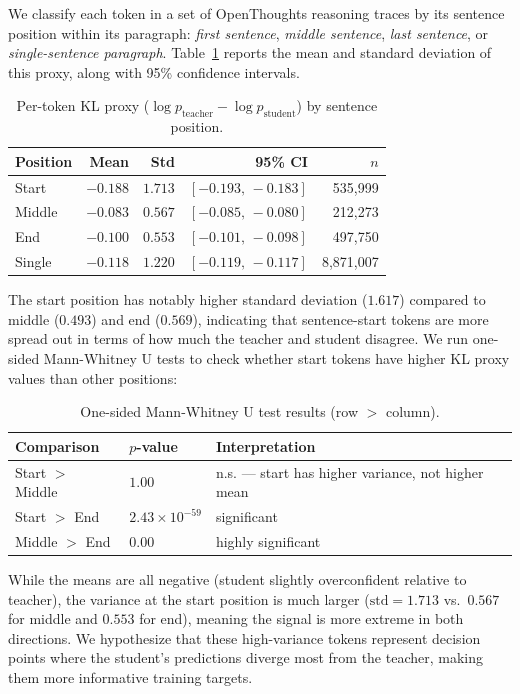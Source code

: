 \documentclass{article}
\begin{document}
We classify each token in a set of OpenThoughts reasoning traces by its sentence position within its paragraph: \emph{first sentence}, \emph{middle sentence}, \emph{last sentence}, or \emph{single-sentence paragraph}.
Table~\ref{tab:kl_stats} reports the mean and standard deviation of this proxy, along with 95\% confidence intervals.

\begin{table}[h]
\caption{Per-token KL proxy ($\log p_{\text{teacher}} - \log p_{\text{student}}$) by sentence position.}
\label{tab:kl_stats}
\centering
\begin{tabular}{lrrrr}
\toprule
Position & Mean & Std & 95\% CI & $n$ \\
\midrule
Start  & $-0.188$ & $1.713$ & $[-0.193,\,-0.183]$ & 535{,}999 \\
Middle & $-0.083$ & $0.567$ & $[-0.085,\,-0.080]$ & 212{,}273 \\
End    & $-0.100$ & $0.553$ & $[-0.101,\,-0.098]$ & 497{,}750 \\
Single & $-0.118$ & $1.220$ & $[-0.119,\,-0.117]$ & 8{,}871{,}007 \\
\bottomrule
\end{tabular}
\end{table}

The start position has notably higher standard deviation ($1.617$) compared to middle ($0.493$) and end ($0.569$), indicating that sentence-start tokens are more spread out in terms of how much the teacher and student disagree.
We run one-sided Mann-Whitney U tests to check whether start tokens have higher KL proxy values than other positions:

\begin{table}[h]
\caption{One-sided Mann-Whitney U test results (row $>$ column).}
\label{tab:mwu}
\centering
\begin{tabular}{lll}
\toprule
Comparison & $p$-value & Interpretation \\
\midrule
Start $>$ Middle & $1.00$ & n.s. — start has higher variance, not higher mean \\
Start $>$ End    & $2.43 \times 10^{-59}$ & significant \\
Middle $>$ End   & $0.00$ & highly significant \\
\bottomrule
\end{tabular}
\end{table}

While the means are all negative (student slightly overconfident relative to teacher), the variance at the start position is much larger ($\text{std}=1.713$ vs.\ $0.567$ for middle and $0.553$ for end), meaning the signal is more extreme in both directions.
We hypothesize that these high-variance tokens represent decision points where the student's predictions diverge most from the teacher, making them more informative training targets.
\end{document}

